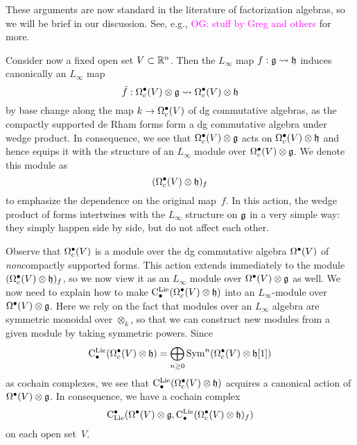 \documentclass[11pt]{amsart}
\numberwithin{equation}{section}
\def\owen{\textcolor{magenta}{OG: }\textcolor{magenta}}
\begin{document}
\begin{rmk}
These arguments are now standard in the literature of factorization algebras, so we will be brief in our discussion.
See, e.g., \cite{CG1} \owen{stuff by Greg and others} for more.
\end{rmk}

Consider now a fixed open set $V \subset \mathbb R^n$.
Then the $L_\infty$ map $f: \mathfrak g \rightsquigarrow \mathfrak h$ induces canonically an $L_\infty$ map 
\[
\tilde{f}: \Omega^\bullet_c(V) \otimes \mathfrak g \rightsquigarrow \Omega^\bullet_c(V) \otimes \mathfrak h
\]
by base change along the map $k \to \Omega^\bullet_c(V)$ of dg commutative algebras,
as the compactly supported de Rham forms form a dg commutative algebra under wedge product.
In consequence, we see that $\Omega^\bullet_c(V) \otimes \mathfrak g$ acts on $\Omega^\bullet_c(V) \otimes \mathfrak h$ and hence equips it with the structure of an $L_\infty$ module over $\Omega^\bullet_c(V) \otimes \mathfrak g$.
We denote this module as
\[
(\Omega^\bullet_c(V) \otimes \mathfrak h)_f
\]
to emphasize the dependence on the original map~$f$.
In this action, the wedge product of forms intertwines with the $L_\infty$ structure on $\mathfrak g$ in a very simple way: 
they simply happen side by side, but do not affect each other.

Observe that $\Omega^\bullet_c(V)$ is a module over the dg commutative algebra $\Omega^\bullet(V)$ of {\em non}\/compactly supported forms.
This action extends immediately to the module $(\Omega^\bullet_c(V) \otimes \mathfrak h)_f$, 
so we now view it as an $L_\infty$ module over $\Omega^\bullet(V) \otimes \mathfrak g$ as well.
We now need to explain how to make ${\rm C}^{\rm Lie}_\bullet(\Omega^\bullet_c(V) \otimes \mathfrak h)$ into an $L_\infty$-module over $\Omega^\bullet(V) \otimes \mathfrak g$.
Here we rely on the fact that modules over an $L_\infty$ algebra are symmetric monoidal over $\otimes_k$, 
so that we can construct new modules from a given module by taking symmetric powers.
Since
\[
{\rm C}^{\rm Lie}_\bullet(\Omega^\bullet_c(V) \otimes \mathfrak h) = \bigoplus_{n \geq 0} {\rm Sym}^n(\Omega^\bullet_c(V) \otimes \mathfrak h[1])
\]
as cochain complexes,
we see that ${\rm C}^{\rm Lie}_\bullet(\Omega^\bullet_c(V) \otimes \mathfrak h)$ acquires a canonical action of $\Omega^\bullet(V) \otimes \mathfrak g$.
In consequence, we have a cochain complex
\[
{\rm C}_{\rm Lie}^\bullet(\Omega^\bullet(V) \otimes \mathfrak g, {\rm C}^{\rm Lie}_\bullet(\Omega^\bullet_c(V) \otimes \mathfrak h)_f)
\]
on each open set~$V$.
\end{document}
